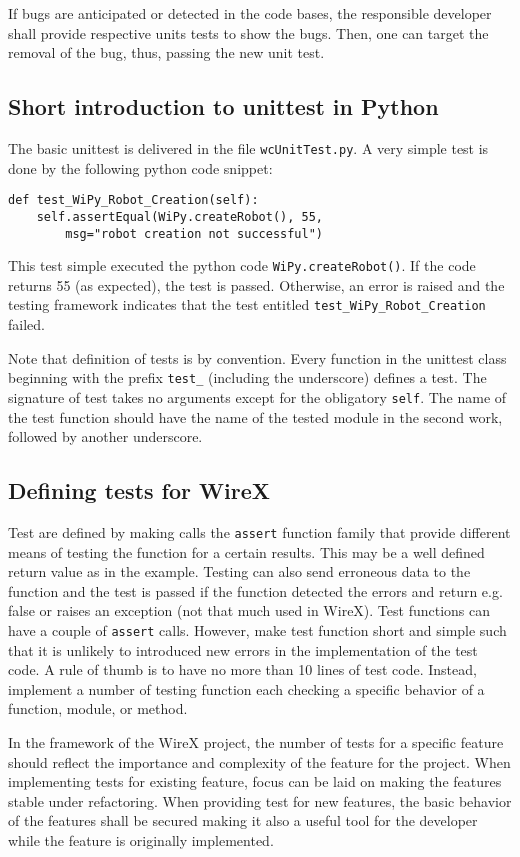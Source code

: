 \documentclass[11pt,a4paper,onepage,openany]{book}
\begin{document}
If bugs are anticipated or detected in the code bases, the responsible
developer shall provide respective units tests to show the bugs. Then, one can
target the removal of the bug, thus, passing the new unit test.

\subsection{Short introduction to unittest in Python}
The basic unittest is delivered in the file \texttt{wcUnitTest.py}. A very
simple test is done by the following python code snippet:
\begin{verbatim}
def test_WiPy_Robot_Creation(self):
    self.assertEqual(WiPy.createRobot(), 55,
        msg="robot creation not successful")
\end{verbatim}
This test simple executed the python code \texttt{WiPy.createRobot()}. If the
code returns 55 (as expected), the test is passed. Otherwise, an error is raised
and the testing framework indicates that the test entitled
\texttt{test\_WiPy\_Robot\_Creation} failed.

Note that definition of tests is by convention. Every function in the unittest
class beginning with the prefix \texttt{test\_} (including the underscore)
defines a test. The signature of test takes no arguments except for the
obligatory \texttt{self}. The name of the test function should have the name of
the tested module in the second work, followed by another underscore.

\subsection{Defining tests for WireX}
Test are defined by making calls the \texttt{assert}
function family that provide different means of testing the function for a
certain results. This may be a well defined return value as in the example.
Testing can also send erroneous data to the function and the test is passed if
the function detected the errors and return e.g. false or raises an exception
(not that much used in WireX). Test functions can have a couple of
\texttt{assert} calls. However, make test function short and simple such that it
is unlikely to introduced new errors in the implementation of the test code. A
rule of thumb is to have no more than 10 lines of test code. Instead, implement
a number of testing function each checking a specific behavior of a function,
module, or method.

In the framework of the WireX project, the number of tests for a specific
feature should reflect the importance and complexity of the feature for the
project. When implementing tests for existing feature, focus can be laid on making the features stable under refactoring. When providing test for new features, the basic behavior of the features shall be secured making it also a useful tool for the developer while the feature is originally implemented.
\end{document}
